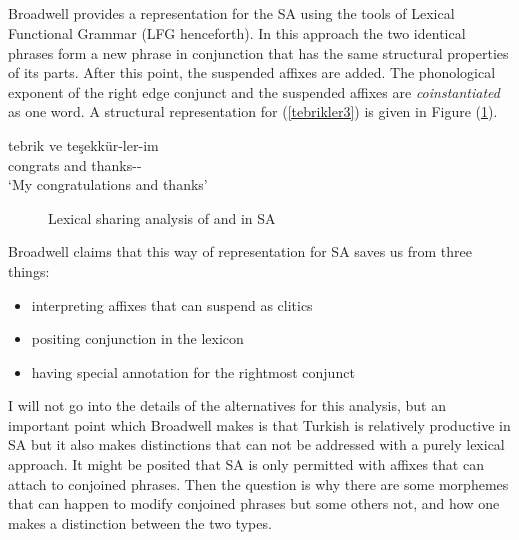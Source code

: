 \subsection{\cite{broadwell2008turkish}}
Broadwell provides a representation for the SA using the tools of Lexical Functional Grammar (LFG henceforth). In this approach the two identical phrases form a new phrase in conjunction that has the same structural properties of its parts. After this point, the suspended affixes are added. The phonological exponent of the right edge conjunct and the suspended affixes are \textit{coinstantiated} as one word. A structural representation for (\ref{tebrikler3}) is given in Figure (\ref{fig:lexicalshare}).

\begin{exe}
    \ex \label{tebrikler3}
    \gll 
    tebrik ve teşekkür-ler-im \\ congrats and thanks-{\Pl}-{\First}{\Sg} \\ 
    \glt `My congratulations and thanks'
\end{exe}
    
\begin{figure}[hbt!]
    \centering
{}
    \caption{Lexical sharing analysis of {\Pl} and {\Poss} in SA}
    \label{fig:lexicalshare}
\end{figure}

Broadwell claims that this way of representation for SA saves us from three things:
\begin{itemize}
    \item  interpreting affixes that can suspend as clitics
    \item positing conjunction in the lexicon
    \item having special annotation for the rightmost conjunct
\end{itemize}
I will not go into the details of the alternatives for this analysis, but an important point which Broadwell makes is that Turkish is relatively productive in SA but it also makes distinctions that can not be addressed with a purely lexical approach. It might be posited that SA is only permitted with affixes that can attach to conjoined phrases. Then the question is why there are some morphemes that can happen to modify conjoined phrases but some others not, and how one makes a distinction between the two types.